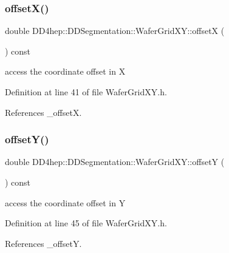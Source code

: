 \subsubsection{\texorpdfstring{offset\+X()}{offsetX()}}
{\footnotesize\ttfamily double D\+D4hep\+::\+D\+D\+Segmentation\+::\+Wafer\+Grid\+X\+Y\+::offsetX (\begin{DoxyParamCaption}{ }\end{DoxyParamCaption}) const\hspace{0.3cm}{\ttfamily [inline]}}



access the coordinate offset in X 



Definition at line 41 of file Wafer\+Grid\+X\+Y.\+h.



References \+\_\+offsetX.

\hypertarget{class_d_d4hep_1_1_d_d_segmentation_1_1_wafer_grid_x_y_aae837386dda1864f17744d167a423feb}{}\label{class_d_d4hep_1_1_d_d_segmentation_1_1_wafer_grid_x_y_aae837386dda1864f17744d167a423feb} 
\subsubsection{\texorpdfstring{offset\+Y()}{offsetY()}}
{\footnotesize\ttfamily double D\+D4hep\+::\+D\+D\+Segmentation\+::\+Wafer\+Grid\+X\+Y\+::offsetY (\begin{DoxyParamCaption}{ }\end{DoxyParamCaption}) const\hspace{0.3cm}{\ttfamily [inline]}}



access the coordinate offset in Y 



Definition at line 45 of file Wafer\+Grid\+X\+Y.\+h.



References \+\_\+offsetY.

\hypertarget{class_d_d4hep_1_1_d_d_segmentation_1_1_wafer_grid_x_y_a1682e14c303ca45e402a1aa648f58558}{}\label{class_d_d4hep_1_1_d_d_segmentation_1_1_wafer_grid_x_y_a1682e14c303ca45e402a1aa648f58558} 
